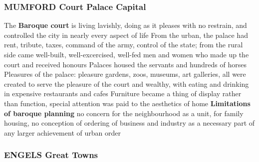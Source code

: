 \documentclass{article}
\begin{document}
\subsubsection{MUMFORD Court Palace Capital}

\begin{outline}
	\1 The \textbf{Baroque court} is living lavishly, doing as it pleases with no restrain, and controlled the city in nearly every aspect of life
		\2 From the urban, the palace had rent, tribute, taxes, command of the army, control of the state; from the rural side came well-built, well-excercised, well-fed men and women who made up the court and received honours
		\2 Palaces housed the servants and hundreds of horses
	\1 Pleasures of the palace: pleasure gardens, zoos, museums, art galleries, all were created to serve the pleasure of the court and wealthy, with eating and drinking in expensive restaurants and cafes
		\2 Furniture became a thing of display rather than function, special attention was paid to the aesthetics of home
	\1 \textbf{Limitations of baroque planning} no concern for the neighbourhood as a unit, for family housing, no conception of ordering of business and industry as a necessary part of any larger achievement of urban order
\end{outline}

\subsubsection{ENGELS Great Towns}
\end{document}

